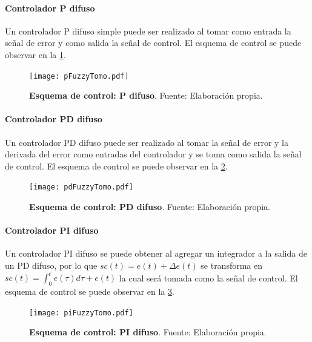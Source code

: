            \paragraph{Controlador P difuso}
                
                Un controlador P difuso simple puede ser realizado al tomar como entrada la señal de error y como salida la señal de control. El esquema de control se puede observar en la \cref{fig:pFuzzyTomo}.

                \begin{figure}[htb]
                    \centering
                    \texttt{[image: pFuzzyTomo.pdf]}
                    \caption[Esquema de control: P difuso]{\textbf{Esquema de control: P difuso}. Fuente: Elaboración propia.} 
                    \label{fig:pFuzzyTomo}
                \end{figure}

            \paragraph{Controlador PD difuso}
                
                Un controlador PD difuso puede ser realizado al tomar la señal de error y la derivada del error como entradas del controlador y se toma como salida la señal de control. El esquema de control se puede observar en la \cref{fig:pdFuzzyTomo}.

                \begin{figure}[htb]
                    \centering
                    \texttt{[image: pdFuzzyTomo.pdf]}
                    \caption[Esquema de control: PD difuso]{\textbf{Esquema de control: PD difuso}. Fuente: Elaboración propia.} 
                    \label{fig:pdFuzzyTomo}
                \end{figure}
            
            \paragraph{Controlador PI difuso}
                
                Un controlador PI difuso se puede obtener al agregar un integrador a la salida de un PD difuso, por lo que $sc(t) = e(t) + \Delta e(t)$ se transforma en $sc(t) = \int_0^t e(\tau)d\tau + e(t)$ la cual será tomada como la señal de control. El esquema de control se puede observar en la \cref{fig:piFuzzyTomo}.

                \begin{figure}[htb]
                    \centering
                    \texttt{[image: piFuzzyTomo.pdf]}
                    \caption[Esquema de control: PI difuso]{\textbf{Esquema de control: PI difuso}. Fuente: Elaboración propia.} 
                    \label{fig:piFuzzyTomo}
                \end{figure}

